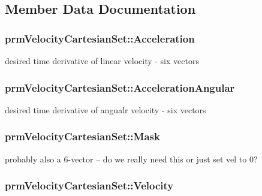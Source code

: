 \subsection{Member Data Documentation}
\hypertarget{classprm_velocity_cartesian_set_a06731c23de2a0df1e3bcb7c4a06e988f}{
\subsubsection[{Acceleration}]{ prm\-Velocity\-Cartesian\-Set\-::\-Acceleration\hspace{0.3cm}{\ttfamily [protected]}}}\label{classprm_velocity_cartesian_set_a06731c23de2a0df1e3bcb7c4a06e988f}
desired time derivative of linear velocity -\/ six vectors \hypertarget{classprm_velocity_cartesian_set_a8a5727216f0caf109547c0cfd3ae6e43}{
\subsubsection[{Acceleration\-Angular}]{ prm\-Velocity\-Cartesian\-Set\-::\-Acceleration\-Angular\hspace{0.3cm}{\ttfamily [protected]}}}\label{classprm_velocity_cartesian_set_a8a5727216f0caf109547c0cfd3ae6e43}
desired time derivative of angualr velocity -\/ six vectors \hypertarget{classprm_velocity_cartesian_set_aac00bb3d01fc051ac28f1ae32e06cfab}{
\subsubsection[{Mask}]{ prm\-Velocity\-Cartesian\-Set\-::\-Mask\hspace{0.3cm}{\ttfamily [protected]}}}\label{classprm_velocity_cartesian_set_aac00bb3d01fc051ac28f1ae32e06cfab}
probably also a 6-\/vector -- do we really need this or just set vel to 0? \hypertarget{classprm_velocity_cartesian_set_a8cc967fe13fe3167899f35394ef46dd0}{
\subsubsection[{Velocity}]{ prm\-Velocity\-Cartesian\-Set\-::\-Velocity\hspace{0.3cm}{\ttfamily [protected]}}}\label{classprm_velocity_cartesian_set_a8cc967fe13fe3167899f35394ef46dd0}
